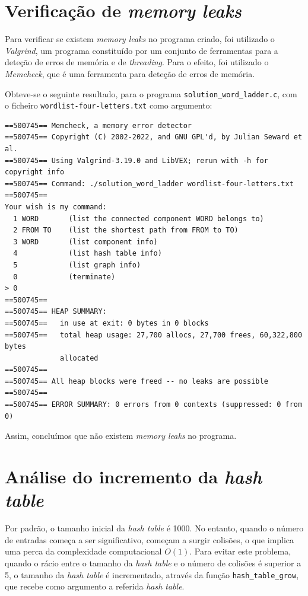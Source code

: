 \documentclass[portuguese,11pt,a4paper,titlepage]{article}
\newcommand{\foreign}[1]{\textit{#1}}
\begin{document}
\section{Verificação de \textit{memory leaks}}
Para verificar se existem \textit{memory leaks} no programa criado, foi utilizado o \foreign{Valgrind}, um programa constituído por um conjunto de ferramentas para a deteção de erros de memória e de \foreign{threading}. Para o efeito, foi utilizado o \foreign{Memcheck}, que é uma ferramenta para deteção de erros de memória.

Obteve-se o seguinte resultado, para o programa \verb|solution_word_ladder.c|, com o ficheiro \verb|wordlist-four-letters.txt| como argumento:

\begin{verbatim}
==500745== Memcheck, a memory error detector
==500745== Copyright (C) 2002-2022, and GNU GPL'd, by Julian Seward et al.
==500745== Using Valgrind-3.19.0 and LibVEX; rerun with -h for copyright info
==500745== Command: ./solution_word_ladder wordlist-four-letters.txt
==500745== 
Your wish is my command:
  1 WORD       (list the connected component WORD belongs to)
  2 FROM TO    (list the shortest path from FROM to TO)
  3 WORD       (list component info)
  4            (list hash table info)
  5            (list graph info)
  0            (terminate)
> 0
==500745== 
==500745== HEAP SUMMARY:
==500745==   in use at exit: 0 bytes in 0 blocks
==500745==   total heap usage: 27,700 allocs, 27,700 frees, 60,322,800 bytes
             allocated
==500745== 
==500745== All heap blocks were freed -- no leaks are possible
==500745== 
==500745== ERROR SUMMARY: 0 errors from 0 contexts (suppressed: 0 from 0)
\end{verbatim}

Assim, concluímos que não existem \textit{memory leaks} no programa. 

\pagebreak
\section{Análise do incremento da \textit{hash table}}
Por padrão, o tamanho inicial da \textit{hash table} é 1000. No entanto, quando o número de entradas começa a ser significativo, começam a surgir colisões, o que implica uma perca da complexidade computacional \begin{math}O(1)\end{math}. Para evitar este problema, quando o rácio entre o tamanho da \textit{hash table} e o número de colisões é superior a 5, o tamanho da \textit{hash table} é incrementado, através da função \verb|hash_table_grow|, que recebe como argumento a referida \textit{hash table}.
\end{document}
